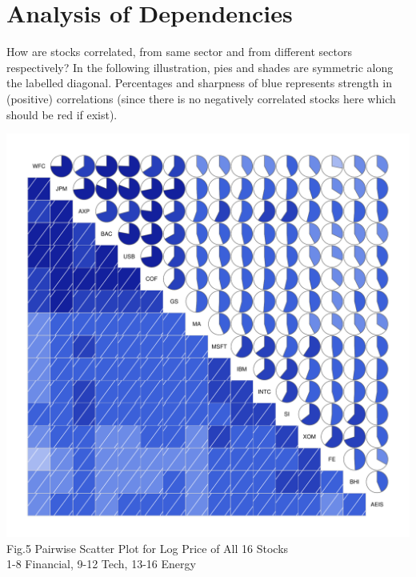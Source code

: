 \documentclass[11pt]{article}
\begin{document}
\section{Analysis of Dependencies}\vspace{-1em}
How are stocks correlated, from same sector and from different sectors respectively? In the following illustration, pies and shades are symmetric along the labelled diagonal. Percentages and sharpness of blue represents strength in (positive) correlations (since there is no negatively correlated stocks here which should be red if exist).
\vspace{-2em}
\begin{center}
  \includegraphics[width=1\linewidth]{graph/PairWiseScatterPlotForAllPie.pdf}\vspace{-1em}\\
  Fig.5 Pairwise Scatter Plot for Log Price of All 16 Stocks\\ 1-8 Financial, 9-12 Tech, 13-16 Energy
\end{center}
\end{document}
